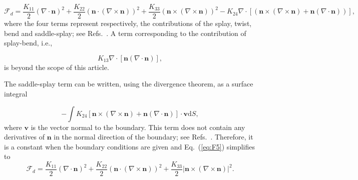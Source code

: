\documentclass[nottitlepage]{article}
\begin{document}
\begin{dmath}\label{eq:F5}
\mathcal{F}_{d}=\frac{K_{11}}{2}(\nabla \cdot \mathbf{n} )^2+\frac{K_{22}}{2}(\mathbf{n}\cdot(\nabla\times\mathbf{n}) )^2+ \frac{K_{33}}{2}(\mathbf{n}\times(\nabla\times\mathbf{n}) )^2-K_{24}\nabla\cdot[(\mathbf{n}\times(\nabla\times\mathbf{n})+\mathbf{n}(\nabla \cdot \mathbf{n}))], %
\end{dmath}
where the four terms represent respectively, the contributions of the splay, twist, bend and saddle-splay; see Refs.~\cite{Mottram, zar, berreman, mori2, zumer}. A term corresponding to the contribution of splay-bend, i.e.,

\begin{equation}\label{eq:splay}
K_{13}\nabla\cdot[\mathbf{n}(\nabla \cdot \mathbf{n})],
\end{equation}
is beyond the scope of this article. %

The saddle-splay term can be written, using the divergence theorem, as a surface integral

\begin{equation}\label{eq:splay2}
-\int K_{24}[\mathbf{n}\times(\nabla\times\mathbf{n})+\mathbf{n}(\nabla \cdot \mathbf{n})]\cdot\mathbf{v}\mathrm{d}S,
\end{equation}
where $\mathbf{v}$ is the vector normal to the boundary. This term does not contain any derivatives of $\mathbf{n}$ in the normal direction of the boundary; see Refs.~\cite{per, fati}. Therefore, it is a constant when the boundary conditions are given and Eq.~(\ref{eq:F5}) simplifies to
\begin{equation}\label{eq:F555}
\mathcal{F}_{d}=\frac{K_{11}}{2}(\nabla \cdot \mathbf{n} )^2+\frac{K_{22}}{2}(\mathbf{n}\cdot(\nabla\times\mathbf{n}) )^2+ \frac{K_{33}}{2}\left|\mathbf{n}\times(\nabla\times\mathbf{n}) \right|^2.
\end{equation}
\end{document}
